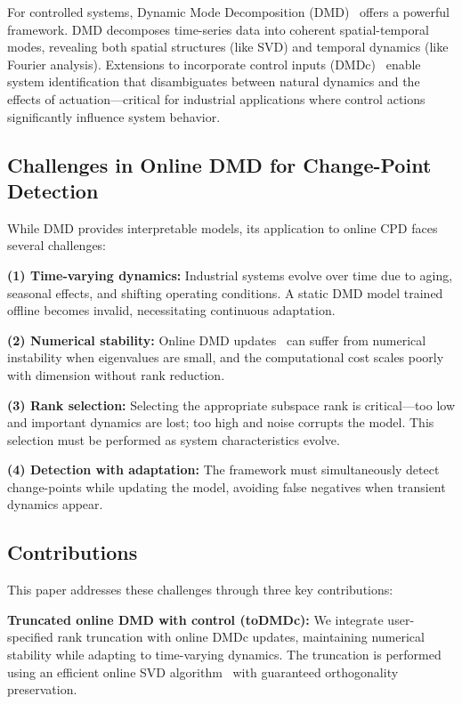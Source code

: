\documentclass[conference]{IEEEtran}
\begin{document}
For controlled systems, Dynamic Mode Decomposition (DMD)~\cite{Schmid2010} offers a powerful framework. DMD decomposes time-series data into coherent spatial-temporal modes, revealing both spatial structures (like SVD) and temporal dynamics (like Fourier analysis). Extensions to incorporate control inputs (DMDc)~\cite{Proctor2016} enable system identification that disambiguates between natural dynamics and the effects of actuation—critical for industrial applications where control actions significantly influence system behavior.

\subsection{Challenges in Online DMD for Change-Point Detection}

While DMD provides interpretable models, its application to online CPD faces several challenges:

\textbf{(1) Time-varying dynamics:} Industrial systems evolve over time due to aging, seasonal effects, and shifting operating conditions. A static DMD model trained offline becomes invalid, necessitating continuous adaptation.

\textbf{(2) Numerical stability:} Online DMD updates~\cite{Zhang2019} can suffer from numerical instability when eigenvalues are small, and the computational cost scales poorly with dimension without rank reduction.

\textbf{(3) Rank selection:} Selecting the appropriate subspace rank is critical—too low and important dynamics are lost; too high and noise corrupts the model. This selection must be performed as system characteristics evolve.

\textbf{(4) Detection with adaptation:} The framework must simultaneously detect change-points while updating the model, avoiding false negatives when transient dynamics appear.

\subsection{Contributions}

This paper addresses these challenges through three key contributions:

\textbf{Truncated online DMD with control (toDMDc):} We integrate user-specified rank truncation with online DMDc updates, maintaining numerical stability while adapting to time-varying dynamics. The truncation is performed using an efficient online SVD algorithm~\cite{Zhang2022} with guaranteed orthogonality preservation.
\end{document}

